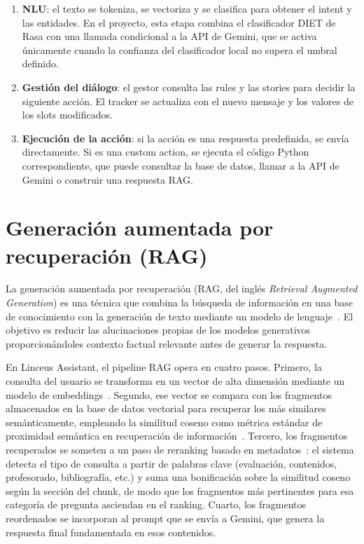 \begin{enumerate}
    \item \textbf{NLU}: el texto se tokeniza, se vectoriza y se clasifica para obtener el intent y las entidades. En el proyecto, esta etapa combina el clasificador DIET de Rasa con una llamada condicional a la API de Gemini, que se activa únicamente cuando la confianza del clasificador local no supera el umbral definido.
    \item \textbf{Gestión del diálogo}: el gestor consulta las rules y las stories para decidir la siguiente acción. El tracker se actualiza con el nuevo mensaje y los valores de los slots modificados.
    \item \textbf{Ejecución de la acción}: si la acción es una respuesta predefinida, se envía directamente. Si es una custom action, se ejecuta el código Python correspondiente, que puede consultar la base de datos, llamar a la API de Gemini o construir una respuesta RAG.
\end{enumerate}

\section{Generación aumentada por recuperación (RAG)}
\label{sec:rag}

La generación aumentada por recuperación (RAG, del inglés \textit{Retrieval Augmented Generation}) es una técnica que combina la búsqueda de información en una base de conocimiento con la generación de texto mediante un modelo de lenguaje~\cite{lewis2020retrieval}. El objetivo es reducir las alucinaciones propias de los modelos generativos~\cite{ji2023survey} proporcionándoles contexto factual relevante antes de generar la respuesta.

En Linceus Assistant, el pipeline RAG opera en cuatro pasos. Primero, la consulta del usuario se transforma en un vector de alta dimensión mediante un modelo de embeddings~\cite{mikolov2013word2vec}. Segundo, ese vector se compara con los fragmentos almacenados en la base de datos vectorial para recuperar los más similares semánticamente, empleando la similitud coseno como métrica estándar de proximidad semántica en recuperación de información~\cite{manning2008introduction}. Tercero, los fragmentos recuperados se someten a un paso de reranking basado en metadatos~\cite{nogueira2019passage}: el sistema detecta el tipo de consulta a partir de palabras clave (evaluación, contenidos, profesorado, bibliografía, etc.) y suma una bonificación sobre la similitud coseno según la sección del chunk, de modo que los fragmentos más pertinentes para esa categoría de pregunta asciendan en el ranking. Cuarto, los fragmentos reordenados se incorporan al prompt que se envía a Gemini, que genera la respuesta final fundamentada en esos contenidos.

